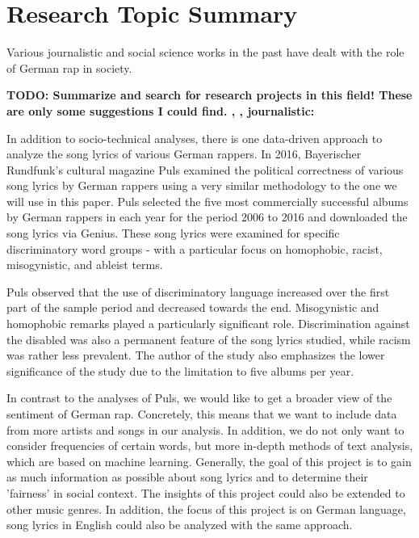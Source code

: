 \section{Research Topic Summary}\label{sec:research}

Various journalistic and social science works in the past have dealt with the role of German rap in society.

\textbf{TODO: Summarize and search for research projects in this field! These are only some suggestions I could find.
\cite{heinisch2018schlampe},
\cite{ahlers_2019},
\cite{wiegel2011deutscher}
journalistic:
\cite{rohwer_2020}}

In addition to socio-technical analyses, there is one data-driven approach to analyze the song lyrics of various German rappers. In 2016, Bayerischer Rundfunk's cultural magazine Puls \cite{puls_2016} examined the political correctness of various song lyrics by German rappers using a very similar methodology to the one we will use in this paper. Puls selected the five most commercially successful albums by German rappers in each year for the period 2006 to 2016 and downloaded the song lyrics via Genius. These song lyrics were examined for specific discriminatory word groups - with a particular focus on homophobic, racist, misogynistic, and ableist terms.

Puls observed that the use of discriminatory language increased over the first part of the sample period and decreased towards the end. Misogynistic and homophobic remarks played a particularly significant role. Discrimination against the disabled was also a permanent feature of the song lyrics studied, while racism was rather less prevalent. The author of the study also emphasizes the lower significance of the study due to the limitation to five albums per year.

In contrast to the analyses of Puls, we would like to get a broader view of the sentiment of German rap. Concretely, this means that we want to include data from more artists and songs in our analysis. In addition, we do not only want to consider frequencies of certain words, but more in-depth methods of text analysis, which are based on machine learning. Generally, the goal of this project is to gain as much information as possible about song lyrics and to determine their 'fairness' in social context. The insights of this project could also be extended to other music genres. In addition, the focus of this project is on German language, song lyrics in English could also be analyzed with the same approach.

